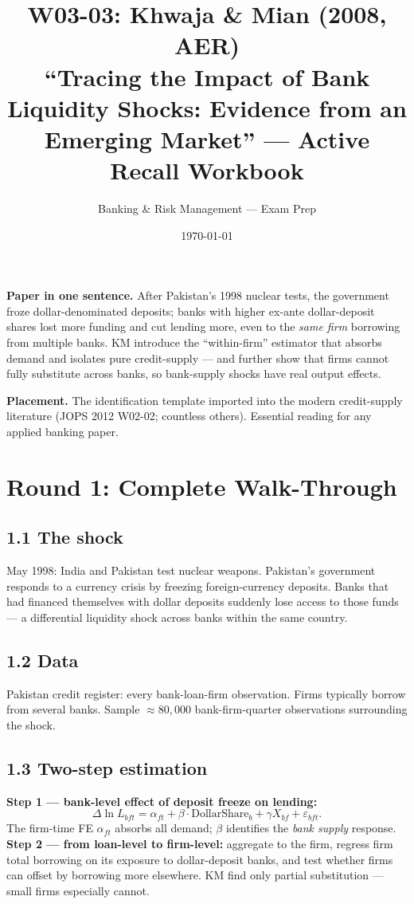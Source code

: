 \documentclass[11pt]{article}
\title{W03-03: Khwaja \& Mian (2008, AER) \\
\large ``Tracing the Impact of Bank Liquidity Shocks: Evidence from an Emerging Market'' --- Active Recall Workbook}
\author{Banking \& Risk Management --- Exam Prep}
\date{\today}
\begin{document}
\maketitle

\begin{keybox}
\textbf{Paper in one sentence.} After Pakistan's 1998 nuclear tests, the government froze dollar-denominated deposits; banks with higher ex-ante dollar-deposit shares lost more funding and cut lending more, even to the \emph{same firm} borrowing from multiple banks. KM introduce the ``within-firm'' estimator that absorbs demand and isolates pure credit-supply --- and further show that firms cannot fully substitute across banks, so bank-supply shocks have real output effects.

\textbf{Placement.} The identification template imported into the modern credit-supply literature (JOPS 2012 W02-02; countless others). Essential reading for any applied banking paper.
\end{keybox}

\section*{Round 1: Complete Walk-Through}

\subsection*{1.1 The shock}
May 1998: India and Pakistan test nuclear weapons. Pakistan's government responds to a currency crisis by freezing foreign-currency deposits. Banks that had financed themselves with dollar deposits suddenly lose access to those funds --- a differential liquidity shock across banks within the same country.

\subsection*{1.2 Data}
Pakistan credit register: every bank-loan-firm observation. Firms typically borrow from several banks. Sample $\approx 80{,}000$ bank-firm-quarter observations surrounding the shock.

\subsection*{1.3 Two-step estimation}
\textbf{Step 1 --- bank-level effect of deposit freeze on lending:}
\[
\Delta \ln L_{bft} = \alpha_{ft} + \beta\cdot \text{DollarShare}_b + \gamma X_{bf} + \varepsilon_{bft}.
\]
The firm-time FE $\alpha_{ft}$ absorbs all demand; $\beta$ identifies the \emph{bank supply} response.
\textbf{Step 2 --- from loan-level to firm-level:} aggregate to the firm, regress firm total borrowing on its exposure to dollar-deposit banks, and test whether firms can offset by borrowing more elsewhere. KM find only partial substitution --- small firms especially cannot.
\end{document}
